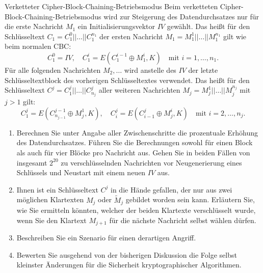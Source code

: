 \documentclass{article}
\begin{document}
\setcounter{subsection}{50}
\begin{exercise}{Verketteter Cipher-Block-Chaining-Betriebsmodus}
  Beim verketteten Cipher-Block-Chaining-Betriebsmodus wird zur Steigerung des Datendurchsatzes nur für die erste Nachricht $M_1$ ein Initialisierungsvektor $IV$ gewählt. Das heißt für den Schlüsseltext $C_1 = C_1^0 || \ldots || C_1^{n_1}$ der ersten Nachricht $M_1 = M_1^1 || \ldots || M_1^{n_1}$ gilt wie beim normalen CBC:
    \[ C_1^0 = IV, \quad C_1^i = E(C_1^{i-1} \oplus M_1^i, K) \quad \text{mit } i = 1, \ldots, n_1. \]
  Für alle folgenden Nachrichten $M_2, \ldots$ wird anstelle des $IV$ der letzte Schlüsseltextblock des vorherigen Schlüsseltextes verwendet. Das heißt für den Schlüsseltext $C^j = C^j_1 || \ldots || C^j_{n_j}$ aller weiteren Nachrichten $M_j = M_j^1 || \ldots || M_j^{n_j}$ mit $j > 1$ gilt:
    \[ C^j_1 = E(C^{j-1}_{n_{j-1}} \oplus M_j^1, K), \quad C^j_i = E(C^j_{i-1} \oplus M_j^i, K) \quad \text{mit } i = 2, \ldots, n_j. \]
  \begin{enumerate}
    \item Berechnen Sie unter Angabe aller Zwischenschritte die prozentuale Erhöhung des Datendurchsatzes. Führen Sie die Berechnungen sowohl für einen Block als auch für vier Blöcke pro Nachricht aus. Gehen Sie in beiden Fällen von insgesamt $2^{20}$ zu verschlüsselnden Nachrichten vor Neugenerierung eines Schlüssels und Neustart mit einem neuen $IV$ aus.
    \item Ihnen ist ein Schlüsseltext $C^j$ in die Hände gefallen, der nur aus zwei möglichen Klartexten $M_j$ oder $\tilde{M}_j$ gebildet worden sein kann. Erläutern Sie, wie Sie ermitteln könnten, welcher der beiden Klartexte verschlüsselt wurde, wenn Sie den Klartext $M_{j+1}$ für die nächste Nachricht selbst wählen dürfen.
    \item Beschreiben Sie ein Szenario für einen derartigen Angriff.
    \item Bewerten Sie ausgehend von der bisherigen Diskussion die Folge selbst kleinster Änderungen für die Sicherheit kryptographischer Algorithmen.
  \end{enumerate}


\end{exercise}
\end{document}
